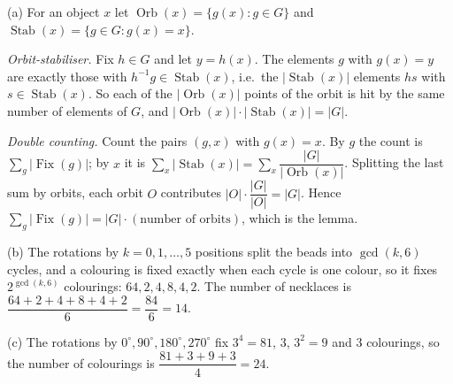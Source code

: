 (a) For an object $x$ let $\operatorname{Orb}(x)=\{g(x):g\in G\}$ and $\operatorname{Stab}(x)=\{g\in G:g(x)=x\}$.

\emph{Orbit-stabiliser.} Fix $h\in G$ and let $y=h(x)$. The elements $g$ with $g(x)=y$ are exactly those with $h^{-1}g\in\operatorname{Stab}(x)$, i.e.\ the $|\operatorname{Stab}(x)|$ elements $hs$ with $s\in\operatorname{Stab}(x)$. So each of the $|\operatorname{Orb}(x)|$ points of the orbit is hit by the same number of elements of $G$, and $|\operatorname{Orb}(x)|\cdot|\operatorname{Stab}(x)|=|G|$.

\emph{Double counting.} Count the pairs $(g,x)$ with $g(x)=x$. By $g$ the count is $\sum_g|\operatorname{Fix}(g)|$; by $x$ it is $\sum_x|\operatorname{Stab}(x)|=\sum_x\dfrac{|G|}{|\operatorname{Orb}(x)|}$. Splitting the last sum by orbits, each orbit $O$ contributes $|O|\cdot\dfrac{|G|}{|O|}=|G|$. Hence $\sum_g|\operatorname{Fix}(g)|=|G|\cdot(\text{number of orbits})$, which is the lemma.

(b) The rotations by $k=0,1,\dots,5$ positions split the beads into $\gcd(k,6)$ cycles, and a colouring is fixed exactly when each cycle is one colour, so it fixes $2^{\gcd(k,6)}$ colourings: $64,2,4,8,4,2$. The number of necklaces is $\dfrac{64+2+4+8+4+2}{6}=\dfrac{84}{6}=\boxed{14}$.

(c) The rotations by $0^\circ,90^\circ,180^\circ,270^\circ$ fix $3^4=81$, $3$, $3^2=9$ and $3$ colourings, so the number of colourings is $\dfrac{81+3+9+3}{4}=\boxed{24}$.
